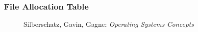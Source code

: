 \documentclass[ignorenonframetext, hyperref=unicode]{beamer}
\begin{document}
\begin{frame}
\frametitle{File Allocation Table}
\begin{figure}[h]
\center
{}
\caption{Silberschatz, Gavin, Gagne: {\em Operating Systems Concepts}}
\end{figure}
\end{frame}
\end{document}

